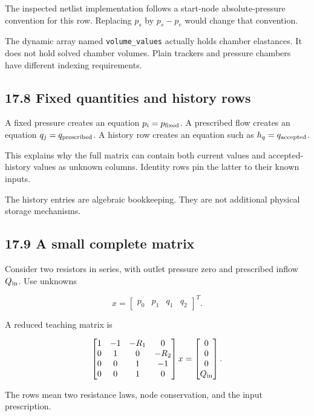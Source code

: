 \documentclass[11pt,a4paper]{article}
\begin{document}
The inspected netlist implementation follows a start-node absolute-pressure convention for this row. Replacing \(p_s\) by \(p_s-p_e\) would change that convention.

The dynamic array named \texttt{volume\_\allowbreak{}values} actually holds chamber elastances. It does not hold solved chamber volumes. Plain trackers and pressure chambers have different indexing requirements.

\subsection{17.8 Fixed quantities and history rows}
A fixed pressure creates an equation \(p_i=p_{\rm fixed}\). A prescribed flow creates an equation \(q_j=q_{\rm prescribed}\). A history row creates an equation such as \(h_q=q_{\rm accepted}\).

This explains why the full matrix can contain both current values and accepted-history values as unknown columns. Identity rows pin the latter to their known inputs.

The history entries are algebraic bookkeeping. They are not additional physical storage mechanisms.

\subsection{17.9 A small complete matrix}
Consider two resistors in series, with outlet pressure zero and prescribed inflow \(Q_{\rm in}\). Use unknowns


\begingroup\small
\[
x=\begin{bmatrix}p_0&p_1&q_1&q_2\end{bmatrix}^{T}.
\]
\endgroup


A reduced teaching matrix is


\begingroup\small
\[
\begin{bmatrix}
1&-1&-R_1&0\\
0&1&0&-R_2\\
0&0&1&-1\\
0&0&1&0
\end{bmatrix}
x=
\begin{bmatrix}0\\0\\0\\Q_{\rm in}\end{bmatrix}.
\]
\endgroup


The rows mean two resistance laws, node conservation, and the input prescription.
\end{document}
